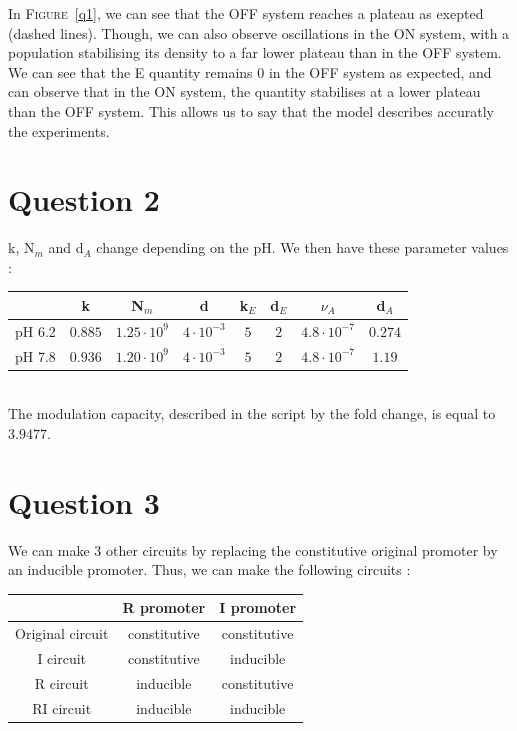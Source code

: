 \documentclass[11pt,a4paper]{report}
\begin{document}
In \textsc{Figure}~\ref{q1}, we can see that the OFF system reaches a plateau as exepted (dashed lines). Though, we can also observe oscillations in the ON system, with a population stabilising its density to a far lower plateau than in the OFF system. We can see that the E quantity remains 0 in the OFF system as expected, and can observe that in the ON system, the quantity stabilises at a lower plateau than the OFF system. This allows us to say that the model describes accuratly the experiments.


\section*{Question 2}
k, N$_m$ and d$_A$ change depending on the pH. We then have these parameter values :\\
\begin{center}
\begin{tabular}{|c|c|c|c|c|c|c|c|}
\hline
~ & k & N$_m$ & d & k$_E$ & d$_E$ & $\nu_A$ & d$_A$ \\
\hline
pH 6.2 & $0.885$ & $1.25 \cdot 10^9$ & $4 \cdot 10^{-3}$ & $5$ & $2$ & $4.8\cdot 10^{-7}$ & $0.274$ \\
\hline
pH 7.8 & $0.936$ & $1.20 \cdot 10^9$ & $4 \cdot 10^{-3}$ & $5$ & $2$ & $4.8\cdot 10^{-7}$ & $1.19$ \\
\hline
\end{tabular}
\end{center}
~\\

The modulation capacity, described in the script by the fold change, is equal to $3.9477$.\\

\section*{Question 3}
We can make 3 other circuits by replacing the constitutive original promoter by an inducible promoter. Thus, we can make the following circuits :\\

\begin{center}
\begin{tabular}{|c|c|c|}
  \hline
  ~ & R promoter & I promoter \\
  \hline
  Original circuit & constitutive & constitutive \\
  \hline
  I circuit & constitutive & inducible \\
  \hline
  R circuit & inducible & constitutive \\
  \hline
  RI circuit & inducible & inducible \\
  \hline
\end{tabular}
\end{center}
\end{document}
